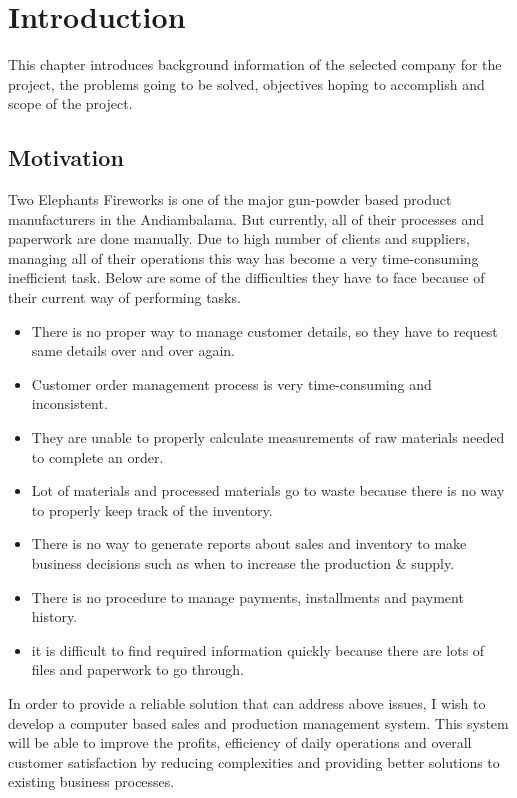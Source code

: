 \documentclass[12pt]{report}
\begin{document}
\chapter{Introduction}
This chapter introduces background information of the selected company for the project, the problems going to be solved, objectives hoping to accomplish and scope of the project.

\section{Motivation}
Two Elephants Fireworks is one of the major gun-powder based product manufacturers in  the Andiambalama. But currently, all of their processes and paperwork are done manually. Due to high number of clients and suppliers, managing all of their operations this way has become a very time-consuming inefficient task. Below are some of the difficulties they have to face because of their current way of performing tasks.

\begin{itemize}
	\item There is no proper way to manage customer details, so they have to request same details over and over again.
	\item Customer order management process is very time-consuming and inconsistent.
	\item They are unable to properly calculate measurements of raw materials needed to complete an order.
	\item Lot of materials and processed materials go to waste because there is no way to properly keep track of the inventory.
	\item There is no way to generate reports about sales and inventory to make business decisions such as when to increase the production \& supply.
	\item There is no procedure to manage payments, installments and payment history.
	\item it is difficult to find required information quickly because there are lots of files and paperwork to go through.
\end{itemize}

In order to provide a reliable solution that can address above issues, I wish to develop a computer based sales and production management system. This system will be able to improve the profits, efficiency of daily operations and overall customer satisfaction by reducing complexities and providing better solutions to existing business processes.
\end{document}
